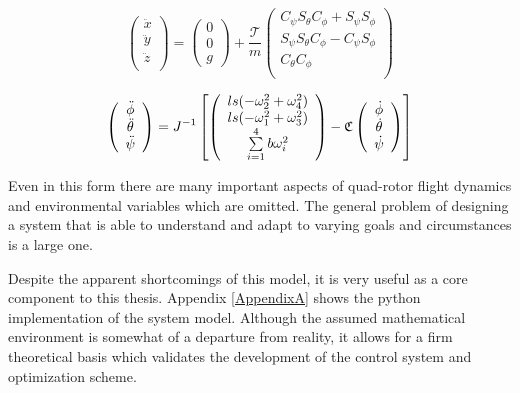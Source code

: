\begin{equation}
    \label{lineareq}
    \left(
        \begin{array}{c}
           \ddot{x}\\
           \ddot{y}\\
           \ddot{z}\\
        \end{array}
    \right)
    = \left(
       \begin{array}{c}
        0\\
        0\\
        g
      \end{array}
    \right)
    +\frac{\mathcal{T}}{m}
     \left(
        \begin{array}{c}
             C_{\psi}S_{\theta}C_{\phi} + S_{\psi}S_{\phi} \\
             S_{\psi}S_{\theta}C_{\phi} - C_{\psi}S_{\phi} \\
             C_{\theta} C_{\phi} \\
        \end{array}
    \right)
\end{equation}

\begin{equation}
    \label{angulareq}
    \left(
        \begin{array}{c}
           \ddot{\phi}\\
           \ddot{\theta}\\
           \ddot{\psi}\\
        \end{array}
    \right) = J^{-1}
    \left[ \left(
        \begin{array}{c}
            l s (-\omega_2^2 + \omega_4^2)\\
            l s (-\omega_1^2 + \omega_3^2)\\
            \sum \limits_{i=1}^4 b \omega_i^2\\
        \end{array}
    \right) -
    \cc
    \left(
        \begin{array}{c}
           \dot{\phi}\\
           \dot{\theta}\\
           \dot{\psi}\\
        \end{array}
    \right)
    \right]
\end{equation}


Even in this form there are many important aspects of quad-rotor flight dynamics and environmental variables which are omitted. The general problem of designing a system that is able to understand and adapt to varying goals and circumstances is a large one.

Despite the apparent shortcomings of this model, it is very useful as a core component to this thesis.  Appendix \ref{AppendixA} shows the python implementation of the system model. Although the assumed mathematical environment is somewhat of a departure from reality, it allows for a firm theoretical basis which validates the development of the control system and optimization scheme.





